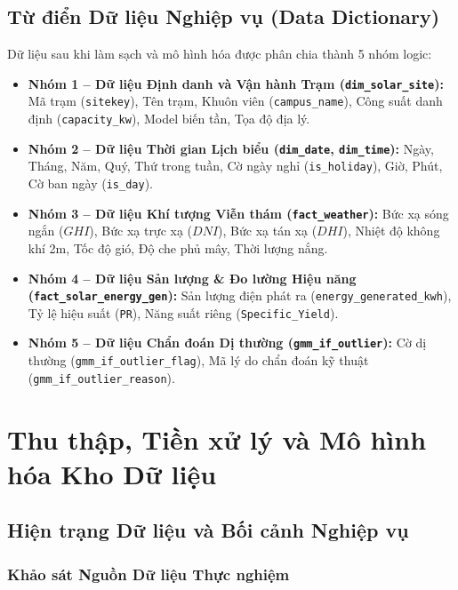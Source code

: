 \documentclass[12pt, a4paper]{report}
\begin{document}
\section{Từ điển Dữ liệu Nghiệp vụ (Data Dictionary)}
\label{sec:tudien_dulieu}

Dữ liệu sau khi làm sạch và mô hình hóa được phân chia thành 5 nhóm logic:
\begin{itemize}[noitemsep]
    \item \textbf{Nhóm 1 -- Dữ liệu Định danh và Vận hành Trạm (\texttt{dim\_solar\_site}):} Mã trạm (\texttt{sitekey}), Tên trạm, Khuôn viên (\texttt{campus\_name}), Công suất danh định (\texttt{capacity\_kw}), Model biến tần, Tọa độ địa lý.
    \item \textbf{Nhóm 2 -- Dữ liệu Thời gian Lịch biểu (\texttt{dim\_date}, \texttt{dim\_time}):} Ngày, Tháng, Năm, Quý, Thứ trong tuần, Cờ ngày nghỉ (\texttt{is\_holiday}), Giờ, Phút, Cờ ban ngày (\texttt{is\_day}).
    \item \textbf{Nhóm 3 -- Dữ liệu Khí tượng Viễn thám (\texttt{fact\_weather}):} Bức xạ sóng ngắn ($GHI$), Bức xạ trực xạ ($DNI$), Bức xạ tán xạ ($DHI$), Nhiệt độ không khí 2m, Tốc độ gió, Độ che phủ mây, Thời lượng nắng.
    \item \textbf{Nhóm 4 -- Dữ liệu Sản lượng \& Đo lường Hiệu năng (\texttt{fact\_solar\_energy\_gen}):} Sản lượng điện phát ra (\texttt{energy\_generated\_kwh}), Tỷ lệ hiệu suất (\texttt{PR}), Năng suất riêng (\texttt{Specific\_Yield}).
    \item \textbf{Nhóm 5 -- Dữ liệu Chẩn đoán Dị thường (\texttt{gmm\_if\_outlier}):} Cờ dị thường (\texttt{gmm\_if\_outlier\_flag}), Mã lý do chẩn đoán kỹ thuật (\texttt{gmm\_if\_outlier\_reason}).
\end{itemize}

\newpage
\chapter{Thu thập, Tiền xử lý và Mô hình hóa Kho Dữ liệu}
\label{chap:etl_modeling}

\section{Hiện trạng Dữ liệu và Bối cảnh Nghiệp vụ}
\label{sec:data_landscape}

\subsection{Khảo sát Nguồn Dữ liệu Thực nghiệm}
\end{document}
